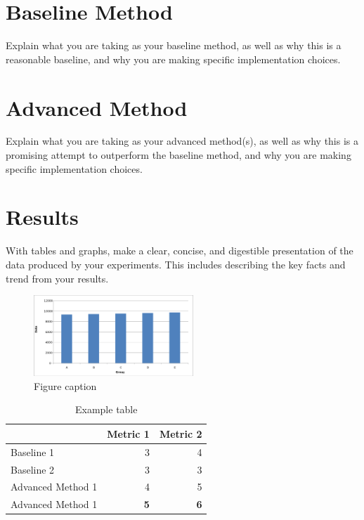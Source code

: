 \documentclass[sigconf]{acmart}
\begin{document}
\section{Baseline Method}

Explain what you are taking as your baseline method, as well as why this is a reasonable baseline, and why you are making specific implementation choices.

\section{Advanced Method}

Explain what you are taking as your advanced method(s), as well as why this is a promising attempt to outperform the baseline method, and why you are making specific implementation choices.

\section{Results}

With tables and graphs, make a clear, concise, and digestible presentation of the data produced by your experiments. This includes describing the key facts and trend from your results.


\begin{figure}[h]
    \includegraphics[width=6cm]{bar_graph.png}
    \caption{Figure caption}
    \label{figure:1}
\end{figure}


\begin{table}[h]
\begin{center}
\caption{Example table}
\begin{tabular}{l|rr}
     & Metric 1 & Metric 2 \\
    \hline
    Baseline 1 &  3 & 4 \\
    Baseline 2 &  3 & 3   \\
    Advanced Method 1 & 4 & 5 \\
    Advanced Method 1 & \textbf{5} & \textbf{6} 
\end{tabular}
\label{table:1}
\end{center}
\end{table}
\end{document}
